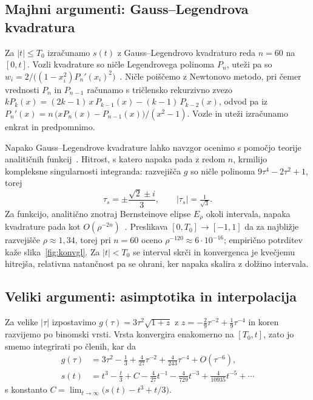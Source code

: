 \documentclass[11pt,a4paper]{article}
\begin{document}
\subsection{Majhni argumenti: Gauss--Legendrova kvadratura}

Za $|t| \le T_0$ izračunamo $s(t)$ z Gauss--Legendrovo kvadraturo reda
$n = 60$ na $[0, t]$. Vozli kvadrature so ničle Legendrovega polinoma $P_n$,
uteži pa so $w_i = 2 / \bigl((1-x_i^2) P_n'(x_i)^2\bigr)$~\cite{gw}. Ničle
poiščemo z Newtonovo metodo, pri čemer vrednosti $P_n$ in $P_{n-1}$ računamo
s tričlensko rekurzivno zvezo
$k P_k(x) = (2k-1)\,x\,P_{k-1}(x) - (k-1)\,P_{k-2}(x)$, odvod pa iz
$P_n'(x) = n\,\bigl(x P_n(x) - P_{n-1}(x)\bigr)/(x^2-1)$. Vozle in uteži
izračunamo enkrat in predpomnimo.


Napako Gauss--Legendrove kvadrature lahko navzgor ocenimo s pomočjo teorije
analitičnih funkcij~\cite{gauss}. Hitrost, s katero napaka pada z redom $n$,
krmilijo kompleksne singularnosti integranda: 
razvejišča $g$ so ničle polinoma $9\tau^4 - 2\tau^2 + 1$, torej
\begin{equation}
  \tau_s = \pm\frac{\sqrt 2 \pm i}{3}, \qquad |\tau_s| = \tfrac{1}{\sqrt 3}.
\end{equation}
Za funkcijo, analitično znotraj Bernsteinove elipse $E_\rho$ okoli intervala,
napaka kvadrature pada kot $O(\rho^{-2n})$~\cite{atap}. Preslikava
$[0, T_0] \to [-1, 1]$ da za najbližje razvejišče $\rho \approx 1{,}34$, 
torej
pri $n = 60$ oceno $\rho^{-120} \approx 6\cdot 10^{-16}$; empirično potrditev
kaže slika~\ref{fig:konvgl}. Za $|t| < T_0$ se interval skrči in konvergenca
je kvečjemu hitrejša, relativna natančnost pa se ohrani, ker napaka skalira z
dolžino intervala.

\subsection{Veliki argumenti: asimptotika in interpolacija}

Za velike $|\tau|$ izpostavimo $g(\tau) = 3\tau^2\sqrt{1 + z}$ z
$z = -\tfrac{2}{9}\tau^{-2} + \tfrac{1}{9}\tau^{-4}$ in koren razvijemo po
binomski vrsti. Vrsta konvergira enakomerno na $[T_0, t]$, zato jo smemo
integrirati po členih, kar da
\begin{align}
  g(\tau) &= 3\tau^2 - \tfrac13 + \tfrac{4}{27}\tau^{-2}
             + \tfrac{4}{243}\tau^{-4} + O(\tau^{-6}),\\
  s(t) &= t^3 - \tfrac{t}{3} + C - \tfrac{4}{27}t^{-1}
          - \tfrac{4}{729}t^{-3} + \tfrac{4}{10935}t^{-5} + \cdots
\end{align}
s konstanto $C = \lim_{t\to\infty}\bigl(s(t) - t^3 + t/3\bigr)$.
\end{document}
